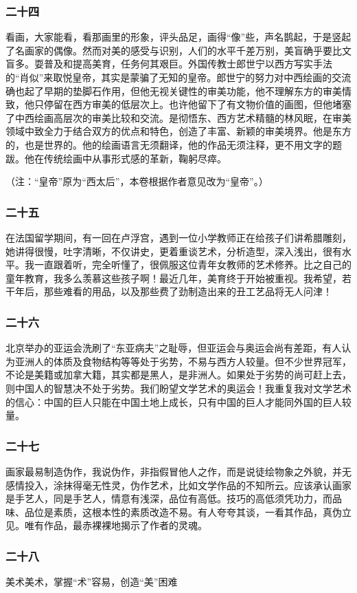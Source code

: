 \documentclass{article}
\begin{document}
\subsubsection{二十四}
看画，大家能看，看那画里的形象，评头品足，画得“像”些，声名鹊起，于是竖起了名画家的偶像。然而对美的感受与识别，人们的水平千差万别，美盲确乎要比文盲多。耍普及和提高美育，任务何其艰巨。外国传教士郎世宁以西方写实手法的“肖似”来取悦皇帝，其实是蒙骗了无知的皇帝。郎世宁的努力对中西绘画的交流确也起了早期的垫脚石作用，但他无视关键性的审美功能，他不理解东方的审美情致，他只停留在西方审美的低层次上。也许他留下了有文物价值的画图，但他堵塞了中西绘画高层次的审美比较和交流。是彻悟东、西方艺术精髓的林风眠，在审美领域中致全力于结合双方的优点和特色，创造了丰富、新颖的审美境界。他是东方的，也是世界的。他的绘画语言无须翻译，他的作品无须注释，更不用文字的题跋。他在传统绘画中从事形式感的革新，鞠躬尽瘁。

（注：“皇帝”原为“西太后”，本卷根据作者意见改为“皇帝”。）
\subsubsection{二十五}
在法国留学期间，有一回在卢浮宫，遇到一位小学教师正在给孩子们讲希腊雕刻，她讲得很慢，吐字清晰，不仅讲史，更着重谈艺术，分析造型，深入浅出，很有水平。我一直跟着听，完全听懂了，很佩服这位青年女教师的艺术修养。比之自己的童年教育，我多么羡慕这些孩子啊！最近几年，美育终于开始被重视。我希望，若干年后，那些难看的用品，以及那些费了劲制造出来的丑工艺品将无人问津！
\subsubsection{二十六}
北京举办的亚运会洗刷了“东亚病夫”之耻辱，但亚运会与奥运会尚有差距，有人认为亚洲人的体质及食物结构等等处于劣势，不易与西方人较量。但不少世界冠军，不论是美籍或加拿大籍，其实都是黑人，是非洲人。如果处于劣势的尚可赶上去，则中国人的智慧决不处于劣势。我们盼望文学艺术的奥运会！我重复我对文学艺术的信心：中国的巨人只能在中国土地上成长，只有中国的巨人才能同外国的巨人较量。
\subsubsection{二十七}
画家最易制造伪作，我说伪作，非指假冒他人之作，而是说徒绘物象之外貌，并无感情投入，涂抹得毫无性灵，伪作艺术，比如文学作品的不知所云。应该承认画家是手艺人，同是手艺人，情意有浅深，品位有高低。技巧的高低须凭功力，而品味、品位是素质，这根本性的素质改造不易。有人夸夸其谈，一看其作品，真伪立见。唯有作品，最赤裸裸地揭示了作者的灵魂。
\subsubsection{二十八}
美术美术，掌握“术”容易，创造“美”困难
\end{document}
